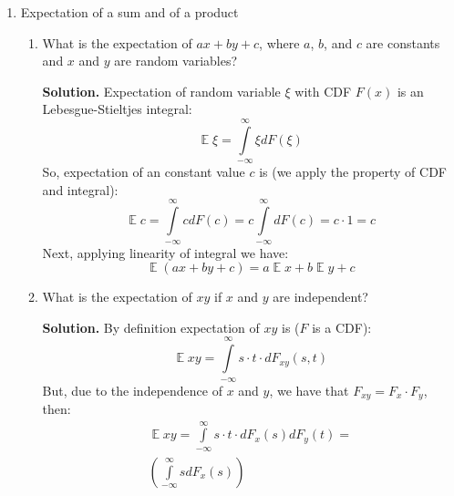 \documentclass[a4paper, 12pt]{article}
\DeclareMathOperator{\E}{\mathbb{E}}
\newcommand{\rbra}[1]{\left( #1 \right)}
\newcommand{\task}[2]{
    \item #1

    \textbf{Solution. } #2
}
\begin{document}
\begin{enumerate}
\begin{enumerate}
              \task{What is the marginal distribution of Y (prob. of values of Y for all X)?}
              {I suppose, that this subtask don't refer to previous one (so we have to calculate marginal
                  distribution without any conditions), so in this case distribution of $Y$ is
                  uniform and every possible result $\overline{1, 6}$ has probability $\frac{1}{6}$.}
              \task{What is the conditional probability that X = 2 given Y = 1?}
              {
                  Let's expand our conditional probability by definition:
                  \[
                      P(X=2 | Y=1) = \frac{P(X=2 \cap Y=1)}{P(Y=1)}
                  \]
                  But $X$ and $Y$ are independent, so we have:
                  \[
                      P(X=2 | Y=1) = P(X=2) = \frac{1}{6}
                  \]
              }
          \end{enumerate}
    \item Expectation of a sum and of a product
          \begin{enumerate}
              \task{What is the expectation of $ax + by+c$, where $a$, $b$, and $c$ are constants and $x$ and $y$ are
                  random variables?}
              {Expectation of random variable $\xi$ with CDF $F(x)$ is an
                  Lebesgue-Stieltjes integral:
                  \[
                      \E \xi = \int\limits_{-\infty}^{\infty} \xi dF(\xi)
                  \]
                  So, expectation of an constant value $c$ is (we apply the property of CDF and integral):
                  \[
                      \E c = \int\limits_{-\infty}^{\infty} c dF(c) = c \int\limits_{-\infty}^{\infty} dF(c) = c \cdot 1 = c
                  \]
                  Next, applying linearity of integral we have:
                  \[
                      \E \rbra{ax + by + c} = a \E x + b \E y + c
                  \]
              }
              \task{What is the expectation of $xy$ if $x$ and $y$ are independent?}
              {
                  By definition expectation of $xy$ is ($F$ is a CDF):
                  \[
                      \E xy = \int\limits_{-\infty}^{\infty} s \cdot t \cdot dF_{xy}(s, t)
                  \]
                  But, due to the independence of $x$ and $y$, we have that
                  $F_{xy} = F_x \cdot F_y$, then:
                  \begin{multline*}
                      \E xy = \int\limits_{-\infty}^{\infty} s \cdot t \cdot dF_x(s) dF_y(t) = \\
                      \rbra{\int\limits_{-\infty}^{\infty} s dF_x(s)}

\end{multline*}}
\end{enumerate}
\end{enumerate}
\end{document}
